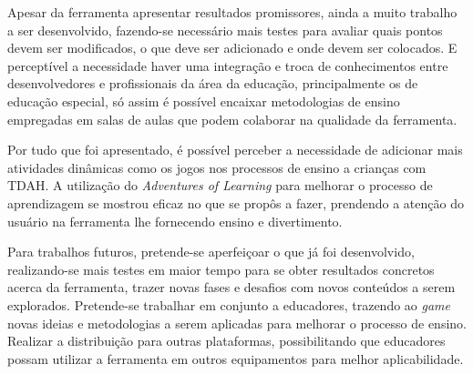 \documentclass[
	12pt,				%
    oneside,			%
	a4paper,			%
	english,			%
	french,				%
	spanish,			%
	brazil,				%
	]{abntex2}
\begin{document}
	Apesar da ferramenta apresentar resultados promissores, ainda a muito trabalho a ser desenvolvido, fazendo-se necessário mais testes para avaliar quais pontos devem ser modificados, o que deve ser adicionado e onde devem ser colocados. E perceptível a necessidade haver uma integração e troca de conhecimentos entre desenvolvedores e profissionais da área da educação, principalmente os de educação especial, só assim é possível encaixar metodologias de ensino empregadas em salas de aulas que podem colaborar na qualidade da ferramenta.
	
	Por tudo que foi apresentado, é possível perceber a necessidade de adicionar mais atividades dinâmicas como os jogos nos processos de ensino a crianças com TDAH. A utilização do \textit{Adventures of Learning} para melhorar o processo de aprendizagem se mostrou eficaz no que se propôs a fazer, prendendo a atenção do usuário na ferramenta lhe fornecendo ensino e divertimento.
	
	Para trabalhos futuros, pretende-se aperfeiçoar o que já foi desenvolvido, realizando-se mais testes em maior tempo para se obter resultados concretos acerca da ferramenta, trazer novas fases e desafios com novos conteúdos a serem explorados. Pretende-se trabalhar em conjunto a educadores, trazendo ao \textit{game} novas ideias e metodologias a serem aplicadas para melhorar o processo de ensino.
	Realizar a distribuição para outras plataformas, possibilitando que educadores possam utilizar a ferramenta em outros equipamentos para melhor aplicabilidade.
	
\postextual


\end{document}
